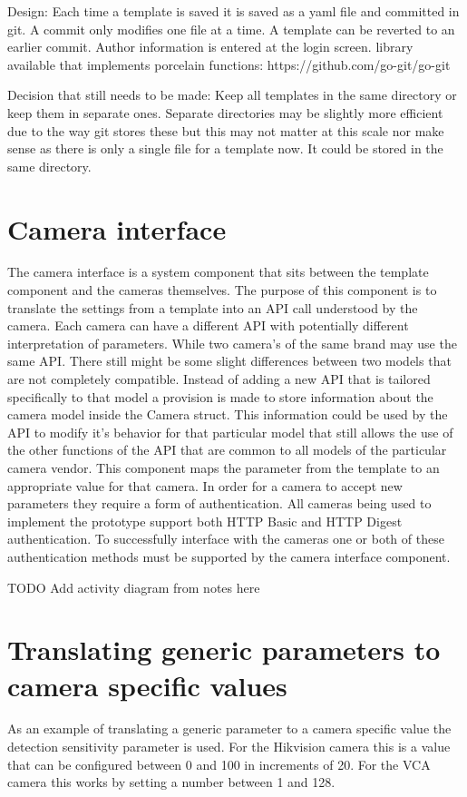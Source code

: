 Design:
Each time a template is saved it is saved as a yaml file and committed in git.
A commit only modifies one file at a time.
A template can be reverted to an earlier commit.
Author information is entered at the login screen.
library available that implements porcelain functions:
https://github.com/go-git/go-git

Decision that still needs to be made:
Keep all templates in the same directory or keep them in separate ones.
Separate directories may be slightly more efficient due to the way git stores these but this may not matter at this scale nor make sense as there is only a single file for a template now.
It could be stored in the same directory.

\section{Camera interface}
The camera interface is a system component that sits between the template component and the cameras themselves. The purpose of this component
is to translate the settings from a template into an API call understood by the camera. Each camera can have a different API with potentially different interpretation of parameters.
While two camera's of the same brand may use the same API.
There still might be some slight differences between two models that are not completely compatible.
Instead of adding a new API that is tailored specifically to that model a provision is made to store information about the camera model inside the Camera struct.
This information could be used by the API to modify it's behavior for that particular model that still allows the use of the other functions of the API that are common to all models of the particular camera vendor.
This component maps the parameter from the template to an appropriate value for that camera.
In order for a camera to accept new parameters they require a form of authentication. All cameras being used to implement the prototype support both HTTP Basic and HTTP Digest authentication.
To successfully interface with the cameras one or both of these authentication methods must be supported by the camera interface component.

TODO Add activity diagram from notes here

\section{Translating generic parameters to camera specific values}
As an example of translating a generic parameter to a camera specific value the detection sensitivity parameter is used.
For the Hikvision camera this is a value that can be configured between 0 and 100 in increments of 20.
For the VCA camera this works by setting a number between 1 and 128.

